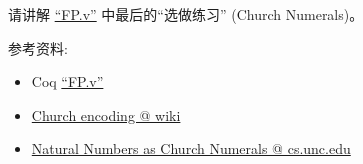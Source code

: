 \documentclass[a4paper, justified]{tufte-handout}
\begin{document}
\vspace{0.50cm}

\begin{ot}
  请讲解 \href{https://github.com/hengxin/problem-solving-class-coq/blob/master/2019-1-coq/FP.v}{``FP.v''} 
  中最后的``选做练习'' (Church Numerals)。

  \noindent 参考资料:
  \begin{itemize}
    \item Coq \href{https://github.com/hengxin/problem-solving-class-coq/blob/master/2019-1-coq/FP.v}{``FP.v''}
    \item \href{https://en.wikipedia.org/wiki/Church\_encoding}{Church encoding @ wiki}
    \item \href{http://www.cs.unc.edu/~stotts/723/Lambda/church.html}{Natural Numbers as Church Numerals @ cs.unc.edu}
  \end{itemize}
\end{ot}

\begincorrection


\beginfb

\end{document}

